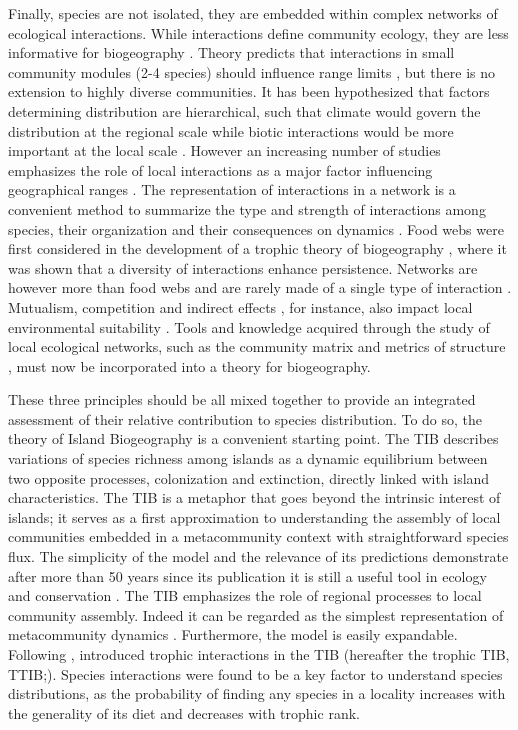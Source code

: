 Finally, species are not isolated, they are embedded within complex networks of ecological interactions. While interactions define community ecology, they are less informative for biogeography \citep{Peterson2003}. Theory predicts that interactions in small community modules (2-4 species) should influence range limits \citep{Gilman2010}, but there is no extension to highly diverse communities. It has been hypothesized that factors determining distribution are hierarchical, such that climate would govern the distribution at the regional scale while biotic interactions would be more important at the local scale \citep{Araujo2014}. However an increasing number of studies emphasizes the role of local interactions as a major factor influencing geographical ranges \citep{Jabot2012, Gotelli2010}. The representation of interactions in a network is a convenient method to summarize the type and strength of interactions among species, their organization \citep{Proulx2005} and their consequences on dynamics \citep{Allesina2012a}. Food webs were first considered in the development of a trophic theory of biogeography \citep{Gravel2011}, where it was shown that a diversity of interactions enhance persistence. Networks are however more than food webs and are rarely made of a single type of interaction \citep{Kefi2012}. Mutualism, competition and indirect effects \citep{Wootton1994}, for instance, also impact local environmental suitability \citep{Godsoe2012}. Tools and knowledge acquired through the study of local ecological networks, such as the community matrix and metrics of structure \citep{Allesina2012a}, must now be incorporated into a theory for biogeography.

These three principles should be all mixed together to provide an integrated assessment of their relative contribution to species distribution. To do so, the theory of Island Biogeography \citep[hereafter referred as TIB,][]{MacArthur1967, Warren2015} is a convenient starting point. The TIB describes variations of species richness among islands as a dynamic equilibrium between two opposite processes, colonization and extinction, directly linked with island characteristics. The TIB is a metaphor that goes beyond the intrinsic interest of islands; it serves as a first approximation to understanding the assembly of local communities embedded in a metacommunity context with straightforward species flux. The simplicity of the model and the relevance of its predictions demonstrate after more than 50 years since its publication it is still a useful tool in ecology and conservation \citep{Cook2002, Warren2015}. The TIB emphasizes the role of regional processes to local community assembly. Indeed it can be regarded as the simplest representation of metacommunity dynamics \citep{Leibold2004}. Furthermore, the model is easily expandable. Following \cite{Holt2009}, \cite{Gravel2011} introduced trophic interactions in the TIB (hereafter the trophic TIB, TTIB;). Species interactions were found to be a key factor to understand species distributions, as the probability of finding any species in a locality increases with the generality of its diet and decreases with trophic rank.

